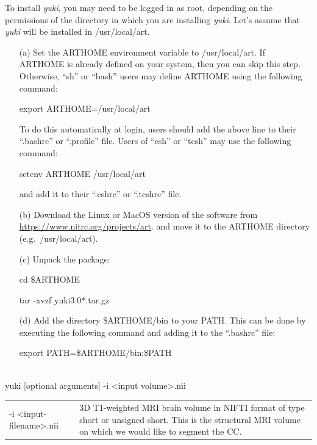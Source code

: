 \documentclass[11pt]{article}
\newcommand{\TG}{\textgreater}
\newcommand{\TL}{\textless}
\begin{document}
To install {\it yuki}, you may need 
to be logged in as root, depending on the permissions of the directory in which
you are installing {\it yuki}. Let's assume that {\it yuki} will be installed in
/usr/local/art.
\begin{itemize}
\item[(a)] Set the ARTHOME environment variable to /usr/local/art. If ARTHOME is already
defined on your system, then you can skip this step. Otherwise, ``sh'' or ``bash'' 
users may define ARTHOME using the following command: 

export ARTHOME=/usr/local/art 

To do this automatically at login, users should add the above line to their 
``.bashrc'' or ``.profile'' file. 
Users of ``csh'' or ``tcsh'' may use the following command:

setenv ARTHOME /usr/local/art 

and add it to their ``.cshrc'' or ``.tcshrc'' file.

\item[(b)] Download the Linux or MacOS version of the software from 
\href{https://www.nitrc.org/projects/art}{https://www.nitrc.org/projects/art}.
and move it to the ARTHOME directory (e.g.\ /usr/local/art).

\item[(c)] Unpack the package:

cd \$ARTHOME

tar -xvzf yuki3.0*.tar.gz

\item[(d)] Add the directory \$ARTHOME/bin to your PATH. This can be done by executing the
following command and adding it to the ``.bashrc'' file:

export PATH=\$ARTHOME/bin:\$PATH

\end{itemize}

\\ 

yuki [optional arguments] -i \TL input volume\TG.nii \\


\begin{longtable}{p{}p{}}
-i \TL input-filename\TG.nii &
3D T1-weighted MRI brain volume in NIFTI format of type short or unsigned short.
This is the structural MRI volume on which we would like to segment the CC.
\end{longtable}
\end{document}
